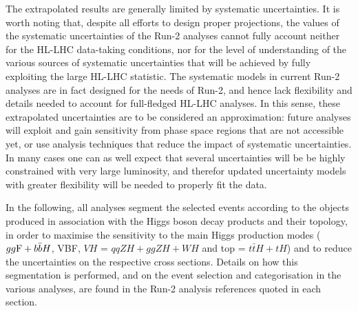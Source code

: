 The extrapolated results are generally limited by systematic uncertainties. It is worth noting that, despite all efforts to design proper projections, the values of the systematic uncertainties of the Run-2 analyses cannot fully account neither for the HL-LHC data-taking conditions, nor for the level of understanding of the various sources of systematic uncertainties that will be achieved by fully exploiting the large HL-LHC statistic. The systematic models in current Run-2 analyses are in fact designed for the needs of Run-2, and hence lack flexibility and details needed to account for full-fledged HL-LHC analyses. In this sense, these extrapolated uncertainties are to be considered an approximation: future analyses will exploit and gain sensitivity from phase space regions that are not accessible yet, or use analysis techniques that reduce the impact of systematic uncertainties. In many cases one can as well expect that several uncertainties will be be highly constrained with very large luminosity, and therefor updated uncertainty models with greater flexibility will be needed to properly fit the data.

In the following, all analyses segment the selected events according to the objects produced in association with the Higgs boson decay products and their topology, in order to maximise the sensitivity to the main Higgs production modes ($gg{\rm F}+b\bar{b}H$, VBF, $VH$ = $qqZH+ggZH+WH$ and top = $t\bar{t}H+tH$)  and to reduce the uncertainties on the respective cross sections. Details on how this segmentation is performed, and on the event selection and categorisation in the various analyses, are found in the Run-2 analysis references quoted in each section.